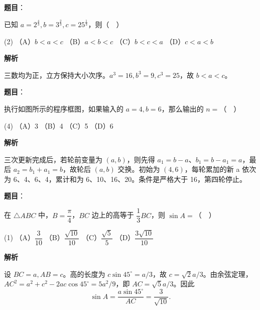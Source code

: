 \begin{answer}

\textbf{题目}：

已知 \(a=2^{\frac43}, b=3^{\frac23}, c=25^{\frac13}\)，则（　）

\begin{gkopts}(2)
\task （A）\(b<a<c\)
\task （B）\(a<b<c\)
\task （C）\(b<c<a\)
\task （D）\(c<a<b\)
\end{gkopts}

\textbf{解析}

三数均为正，立方保持大小次序。\(a^3=16,b^3=9,c^3=25\)，故 \(b<a<c\)。


\end{answer}
\begin{answer}

\textbf{题目}：

执行如图所示的程序框图，如果输入的 \(a=4,b=6\)，那么输出的 \(n=\)（　）
\nopagebreak[4]
\begin{center}\end{center}
\nopagebreak[4]
\begin{gkopts}(4)
\task （A）3
\task （B）4
\task （C）5
\task （D）6
\end{gkopts}

\textbf{解析}

三次更新完成后，若轮前变量为 \((a,b)\)，则先得 \(a_1=b-a\)、\(b_1=b-a_1=a\)，最后 \(a_2=b_1+a_1=b\)，故轮后 \((a,b)\) 交换。初始为 \((4,6)\)，每轮累加的新 a 依次为 6、4、6、4，累计和为 6、10、16、20。条件是严格大于 16，第四轮停止。


\end{answer}
\begin{answer}

\textbf{题目}：

在 \(\triangle ABC\) 中，\(B=\dfrac\pi4\)，\(BC\) 边上的高等于 \(\dfrac13BC\)，则 \(\sin A=\)（　）

\begin{gkopts}(1)
\task （A）\(\dfrac3{10}\)
\task （B）\(\dfrac{\sqrt{10}}{10}\)
\task （C）\(\dfrac{\sqrt5}{5}\)
\task （D）\(\dfrac{3\sqrt{10}}{10}\)
\end{gkopts}

\textbf{解析}

设 \(BC=a,AB=c\)。高的长度为 \(c\sin45^\circ=a/3\)，故 \(c=\sqrt2a/3\)。由余弦定理，\(AC^2=a^2+c^2-2ac\cos45^\circ=5a^2/9\)，即 \(AC=\sqrt5a/3\)。因此
\nopagebreak[4]
\[
\sin A=\frac{a\sin45^\circ}{AC}=\frac3{\sqrt{10}}.
\]


\end{answer}
